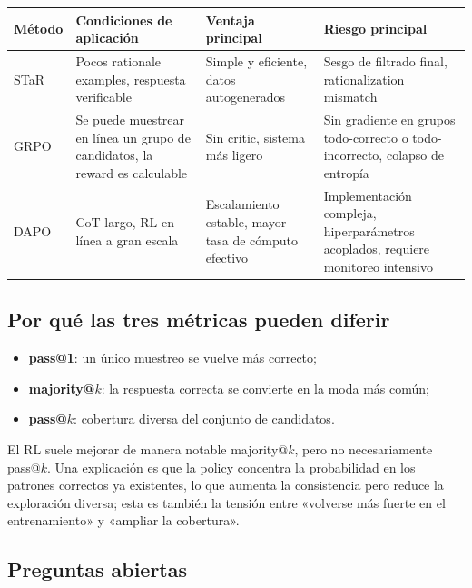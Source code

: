 \documentclass[a4paper]{article}
\begin{document}
\begin{table}[H]
\centering
\small
\begin{tabular}{>{\raggedright\arraybackslash}p{2.2cm}>{\raggedright\arraybackslash}p{3.6cm}>{\raggedright\arraybackslash}p{3.6cm}>{\raggedright\arraybackslash}p{4.0cm}}
\toprule
\textbf{Método} & \textbf{Condiciones de aplicación} & \textbf{Ventaja principal} & \textbf{Riesgo principal} \\
\midrule
STaR & Pocos rationale examples, respuesta verificable & Simple y eficiente, datos autogenerados & Sesgo de filtrado final, rationalization mismatch \\
GRPO & Se puede muestrear en línea un grupo de candidatos, la reward es calculable & Sin critic, sistema más ligero & Sin gradiente en grupos todo-correcto o todo-incorrecto, colapso de entropía \\
DAPO & CoT largo, RL en línea a gran escala & Escalamiento estable, mayor tasa de cómputo efectivo & Implementación compleja, hiperparámetros acoplados, requiere monitoreo intensivo \\
\bottomrule
\end{tabular}
\end{table}

\subsection{Por qué las tres métricas pueden diferir}


\begin{itemize}
    \item \textbf{pass@1}: un único muestreo se vuelve más correcto;
    \item \textbf{majority@$k$}: la respuesta correcta se convierte en la moda más común;
    \item \textbf{pass@$k$}: cobertura diversa del conjunto de candidatos.
\end{itemize}

El RL suele mejorar de manera notable majority@$k$, pero no necesariamente pass@$k$. Una explicación es que la policy concentra la probabilidad en los patrones correctos ya existentes, lo que aumenta la consistencia pero reduce la exploración diversa; esta es también la tensión entre «volverse más fuerte en el entrenamiento» y «ampliar la cobertura».

\subsection{Preguntas abiertas}
\end{document}
